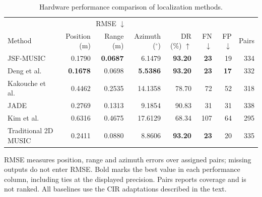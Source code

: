 \begin{table}[t]
\centering
\caption{Hardware performance comparison of localization methods.}
\label{tab:baseline}
\footnotesize
\setlength{\tabcolsep}{3pt}
\begin{tabular}{lrrrrrrr}
\hline
 & \multicolumn{3}{c}{RMSE $\downarrow$} & & & & \\ Method & Position (m) & Range (m) & Azimuth ($^\circ$) & DR (\%) $\uparrow$ & FN $\downarrow$ & FP $\downarrow$ & Pairs \\
\hline
JSF-MUSIC & 0.1790 & \textbf{0.0687} & 6.1479 & \textbf{93.20} & \textbf{23} & 19 & 334 \\
Deng et al.\ \cite{deng2023lowcomplexity} & \textbf{0.1678} & 0.0698 & \textbf{5.5386} & \textbf{93.20} & \textbf{23} & \textbf{17} & 332 \\
Kakouche et al.\ \cite{kakouche2021joint} & 0.4462 & 0.2535 & 14.1358 & 78.70 & 72 & 52 & 318 \\
JADE \cite{vanderveen1998jade} & 0.2769 & 0.1313 & 9.1854 & 90.83 & 31 & 31 & 338 \\
Kim et al.\ \cite{kim2015joint} & 0.6316 & 0.4675 & 17.6129 & 68.34 & 107 & 64 & 295 \\
Traditional 2D MUSIC \cite{wang2014successive} & 0.2411 & 0.0880 & 8.8606 & \textbf{93.20} & \textbf{23} & 20 & 335 \\
\hline
\end{tabular}
\par\smallskip\parbox{0.98\linewidth}{\scriptsize RMSE measures position, range and azimuth errors over assigned pairs; missing outputs do not enter RMSE. Bold marks the best value in each performance column, including ties at the displayed precision. Pairs reports coverage and is not ranked. All baselines use the CIR adaptations described in the text.}
\end{table}
